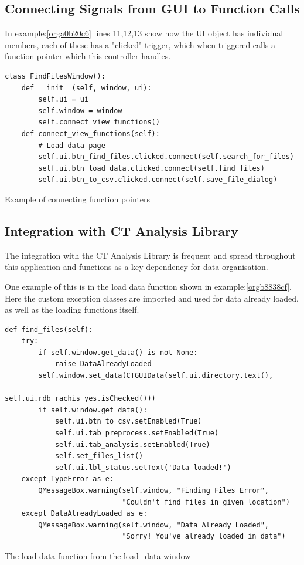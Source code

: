 \documentclass[11pt]{report}
\begin{document}
\subsection{Connecting Signals from GUI to Function Calls}
\label{sec:org0f8c077}
In example:\ref{orga0b20c6} lines 11,12,13 show how the UI object has individual members, each of these has a "clicked" trigger, which when triggered calls a function pointer which this controller handles.
\begin{listing}[htbp]
\begin{verbatim}
class FindFilesWindow():
    def __init__(self, window, ui):
        self.ui = ui
        self.window = window
        self.connect_view_functions()
    def connect_view_functions(self):
        # Load data page
        self.ui.btn_find_files.clicked.connect(self.search_for_files)
        self.ui.btn_load_data.clicked.connect(self.find_files)
        self.ui.btn_to_csv.clicked.connect(self.save_file_dialog)
\end{verbatim}
\caption{\label{orga0b20c6}
Example of connecting function pointers}
\end{listing}

\subsection{Integration with CT Analysis Library}
\label{sec:orgc334811}

The integration with the CT Analysis Library is frequent and spread throughout this application and functions as a key dependency for data organisation.

One example of this is in the load data function shown in example:\ref{orgb8838cf}. Here the custom exception classes are imported and used for data already loaded, as well as the loading functions itself.

\begin{listing}[htbp]
\begin{verbatim}
def find_files(self):
    try:
        if self.window.get_data() is not None:
            raise DataAlreadyLoaded
        self.window.set_data(CTGUIData(self.ui.directory.text(),
                                       self.ui.rdb_rachis_yes.isChecked()))
        if self.window.get_data():
            self.ui.btn_to_csv.setEnabled(True)
            self.ui.tab_preprocess.setEnabled(True)
            self.ui.tab_analysis.setEnabled(True)
            self.set_files_list()
            self.ui.lbl_status.setText('Data loaded!')
    except TypeError as e:
        QMessageBox.warning(self.window, "Finding Files Error",
                            "Couldn't find files in given location")
    except DataAlreadyLoaded as e:
        QMessageBox.warning(self.window, "Data Already Loaded",
                            "Sorry! You've already loaded in data")
\end{verbatim}
\caption{\label{orgb8838cf}
The load data function from the load\_data window}
\end{listing}
\end{document}
